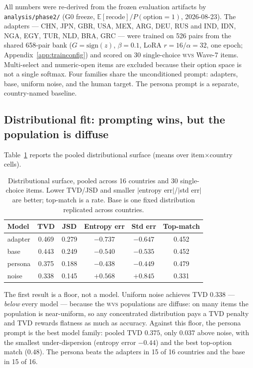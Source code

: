 \documentclass[10pt,letterpaper]{article}
\newcommand{\WVS}{\textsc{wvs}}
\begin{document}
All numbers were re-derived from the frozen evaluation artifacts by \texttt{analysis/phase2/} (G0 freeze, $\mathbb{E}[\mathrm{recode}]/P(\mathrm{option}=1)$, 2026-08-23). The adapters --- CHN, JPN, GBR, USA, MEX, ARG, DEU, RUS and IND, IDN, NGA, EGY, TUR, NLD, BRA, GRC --- were trained on 526 pairs from the shared 658-pair bank ($G=\mathrm{sign}(z)$, $\beta=0.1$, LoRA $r=16/\alpha=32$, one epoch; Appendix~\ref{app:trainconfig}) and scored on 30 single-choice \WVS{} Wave-7 items. Multi-select and numeric-open items are excluded because their option space is not a single softmax. Four families share the unconditioned prompt: adapters, base, uniform noise, and the human target. The persona prompt is a separate, country-named baseline.

\subsection{Distributional fit: prompting wins, but the population is diffuse}
Table~\ref{tab:res-distributional} reports the pooled distributional surface (means over item$\times$country cells).

\begin{table}[H]
\centering\small
\caption{Distributional surface, pooled across 16 countries and 30 single-choice items. Lower TVD/JSD and smaller $|$entropy err$|$/$|$std err$|$ are better; top-match is a rate. Base is one fixed distribution replicated across countries.}\label{tab:res-distributional}
\begin{tabular}{lccccc}
\toprule
Model & TVD & JSD & Entropy err & Std err & Top-match\\
\midrule
adapter & 0.469 & 0.279 & $-0.737$ & $-0.647$ & 0.452\\
base & 0.443 & 0.249 & $-0.540$ & $-0.535$ & 0.452\\
persona & 0.375 & 0.188 & $-0.438$ & $-0.449$ & 0.479\\
noise & 0.338 & 0.145 & $+0.568$ & $+0.845$ & 0.331\\
\bottomrule
\end{tabular}
\end{table}

The first result is a floor, not a model. Uniform noise achieves TVD $0.338$ --- \emph{below} every model --- because the \WVS{} populations are diffuse: on many items the population is near-uniform, so any concentrated distribution pays a TVD penalty and TVD rewards flatness as much as accuracy. Against this floor, the persona prompt is the best model family: pooled TVD $0.375$, only $0.037$ above noise, with the smallest under-dispersion (entropy error $-0.44$) and the best top-option match ($0.48$). The persona beats the adapters in 15 of 16 countries and the base in 15 of 16.
\end{document}
